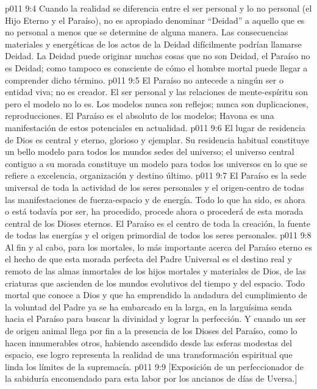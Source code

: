 \vs p011 9:4 Cuando la realidad se diferencia entre el ser personal y lo no personal (el Hijo Eterno y el Paraíso), no es apropiado denominar “Deidad” a aquello que es no personal a menos que se determine de alguna manera. Las consecuencias materiales y energéticas de los actos de la Deidad difícilmente podrían llamarse Deidad. La Deidad puede originar muchas cosas que no son Deidad, el Paraíso no es Deidad; como tampoco es consciente de cómo el hombre mortal puede llegar a comprender dicho término.
\vs p011 9:5 \pc El Paraíso no antecede a ningún ser o entidad viva; no es creador. El ser personal y las relaciones de mente\hyp{}espíritu son  pero el modelo no lo es. Los modelos nunca son reflejos; nunca son duplicaciones, reproducciones. El Paraíso es el absoluto de los modelos; Havona es una manifestación de estos potenciales en actualidad.
\vs p011 9:6 \pc El lugar de residencia de Dios es central y eterno, glorioso y ejemplar. Su residencia habitual constituye un bello modelo para todos los mundos sedes del universo; el universo central contiguo a su morada constituye un modelo para todos los universos en lo que se refiere a excelencia, organización y destino último.
\vs p011 9:7 El Paraíso es la sede universal de toda la actividad de los seres personales y el origen\hyp{}centro de todas las manifestaciones de fuerza\hyp{}espacio y de energía. Todo lo que ha sido, es ahora o está todavía por ser, ha procedido, procede ahora o procederá de esta morada central de los Dioses eternos. El Paraíso es el centro de toda la creación, la fuente de todas las energías y el origen primordial de todos los seres personales.
\vs p011 9:8 \pc Al fin y al cabo, para los mortales, lo más importante acerca del Paraíso eterno es el hecho de que esta morada perfecta del Padre Universal es el destino real y remoto de las almas inmortales de los hijos mortales y materiales de Dios, de las criaturas que ascienden de los mundos evolutivos del tiempo y del espacio. Todo mortal que conoce a Dios y que ha emprendido la andadura del cumplimiento de la voluntad del Padre ya se ha embarcado en la larga, en la larguísima senda hacia el Paraíso para buscar la divinidad y lograr la perfección. Y cuando un ser de origen animal llega por fin a la presencia de los Dioses del Paraíso, como lo hacen innumerables otros, habiendo ascendido desde las esferas modestas del espacio, ese logro representa la realidad de una transformación espiritual que linda los límites de la supremacía.
\vsetoff
\vs p011 9:9 [Exposición de un perfeccionador de la sabiduría encomendado para esta labor por los ancianos de días de Uversa.]
